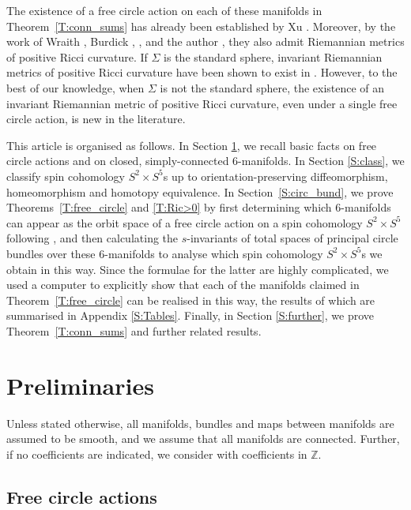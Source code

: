 \documentclass[pdftex]{sigma}
\numberwithin{equation}{section}
\theoremstyle{definition}
\numberwithin{table}{section}
\newcommand{\Z}{\mathbb{Z}}
\begin{document}
The existence of a free circle action on each of these manifolds in Theorem~\ref{T:conn_sums} has already been established by Xu \cite{Xu25}. Moreover, by the work of Wraith \cite{Wr97}, Burdick \cite[Corollary 1.3.5]{Bu19a}, \cite[Theorem B]{Bu19}, \cite[Theorem B]{Bu20} and the author \cite[Theorem C]{Re23}, they also admit Riemannian metrics of positive Ricci curvature. If $\Sigma$ is the standard sphere, invariant Riemannian metrics of positive Ricci curvature have been shown to exist in \cite[Corollary H]{GR25}. However, to the best of our knowledge, when $\Sigma$ is not the standard sphere, the existence of an invariant Riemannian metric of positive Ricci curvature, even under a single free circle action, is new in the literature.

This article is organised as follows. In Section \ref{S:prel}, we recall basic facts on free circle actions and on closed, simply-connected 6-manifolds. In Section \ref{S:class}, we classify spin cohomology $S^2\times S^5$s up to orientation-preserving diffeomorphism, homeomorphism and homotopy equivalence. In Section~\ref{S:circ_bund}, we prove Theorems~\ref{T:free_circle} and \ref{T:Ric>0} by first determining which $6$-manifolds can appear as the orbit space of a free circle action on a spin cohomology $S^2\times S^5$ following \cite{Xu25}, and then calculating the $s$-invariants of total spaces of principal circle bundles over these $6$-manifolds to analyse which spin cohomology $S^2\times S^5$s we obtain in this way. Since the formulae for the latter are highly complicated, we used a computer to explicitly show that each of the manifolds claimed in Theorem~\ref{T:free_circle} can be realised in this way, the results of which are summarised in Appendix \ref{S:Tables}. Finally, in Section \ref{S:further}, we prove Theorem~\ref{T:conn_sums} and further related results.




\section{Preliminaries}\label{S:prel}

Unless stated otherwise, all manifolds, bundles and maps between manifolds are assumed to be smooth, and we assume that all manifolds are connected. Further, if no coefficients are indicated, we consider  with coefficients in $\Z$.

\subsection{Free circle actions}
\end{document}

